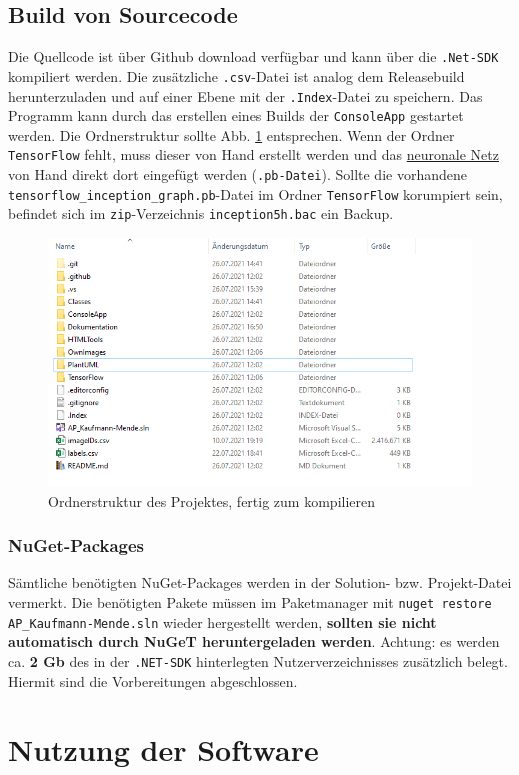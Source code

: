 \documentclass[doktyp=parbeit]{TUBAFarbeiten}
\begin{document}
\subsection{Build von Sourcecode}
Die Quellcode ist über Github download verfügbar und kann über die \texttt{.Net-SDK} kompiliert werden. Die zusätzliche \texttt{.csv}-Datei ist analog dem Releasebuild herunterzuladen und auf einer Ebene mit der \texttt{.Index}-Datei zu speichern. Das Programm kann durch das erstellen eines Builds der \texttt{ConsoleApp} gestartet werden. Die Ordnerstruktur sollte Abb. \ref{fig:github} entsprechen. Wenn der Ordner \texttt{TensorFlow} fehlt, muss dieser von Hand erstellt werden und das \href{https://storage.googleapis.com/download.tensorflow.org/models/inception5h.zip}{neuronale Netz} von Hand direkt dort eingefügt werden (\texttt{.pb-Datei}). Sollte die vorhandene \texttt{tensorflow\_inception\_graph.pb}-Datei im Ordner \texttt{TensorFlow} korumpiert sein, befindet sich im \texttt{zip}-Verzeichnis \texttt{inception5h.bac} ein Backup.
\begin{figure}
	\centering
	\includegraphics[width=0.7\linewidth]{Bilder/github}
	\caption{Ordnerstruktur des Projektes, fertig zum kompilieren}
	\label{fig:github}
\end{figure}
\subsubsection*{NuGet-Packages}
Sämtliche benötigten NuGet-Packages werden in der Solution- bzw. Projekt-Datei vermerkt. Die benötigten Pakete müssen im Paketmanager mit \texttt{nuget restore AP\_Kaufmann-Mende.sln} wieder hergestellt werden, \textbf{sollten sie nicht automatisch durch NuGeT heruntergeladen werden}. Achtung: es werden ca. \textbf{2 Gb} des in der \texttt{.NET-SDK} hinterlegten Nutzerverzeichnisses zusätzlich belegt. Hiermit sind die Vorbereitungen abgeschlossen.	
\section{Nutzung der Software}
\end{document}
